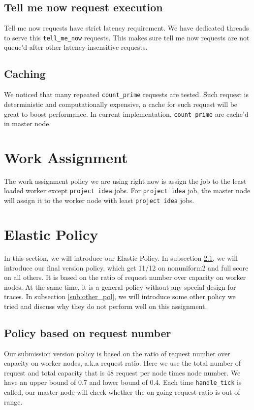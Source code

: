 \documentclass[11pt]{article}
\newcommand{\code}[1]{\texttt{#1}}
\begin{document}
\subsection{Tell me now request execution} %
\label{sub:compare_prime_execution}
Tell me now requests have strict latency requirement. We have dedicated threads to serve this \code{tell\_me\_now} requests. This makes sure tell me now requests are not queue'd after other latency-insensitive requests. 

\subsection{Caching} %
\label{sub:caching}
We noticed that many repeated \code{count\_prime} requests are tested. Such request is deterministic and computationally expensive, a cache for such request will be great to boost performance. In current implementation, \code{count\_prime} are cache'd in master node. 


\section{Work Assignment} %
\label{sec:work_assignment}
The work assignment policy we are using right now is assign the job to the least loaded worker except \code{project idea} jobs.
For \code{project idea} job, the master node will assign it to the worker node with least \code{project idea} jobs.

\section{Elastic Policy} %
In this section, we will introduce our Elastic Policy.
In subsection \ref{sub:policy_based_on_request_number}, we will introduce our final version policy, which get 11/12 on nonuniform2 and full score on all others.
It is based on the ratio of request number over capacity on worker nodes.
At the same time, it is a general policy without any special design for traces.
In subsection \ref{sub:other_pol}, we will introduce some other policy we tried and discuss why they do not perform well on this assignment.

\subsection{Policy based on request number} %
\label{sub:policy_based_on_request_number}
Our submission version policy is based on the ratio of request number over capacity on worker nodes, a.k.a request ratio.
Here we use the total number of request and total capacity that is 48 request per node times node number.
We have an upper bound of 0.7 and lower bound of 0.4.
Each time \code{handle\_tick} is called, our master node will check whether the on going request ratio is out of range.
\end{document}
